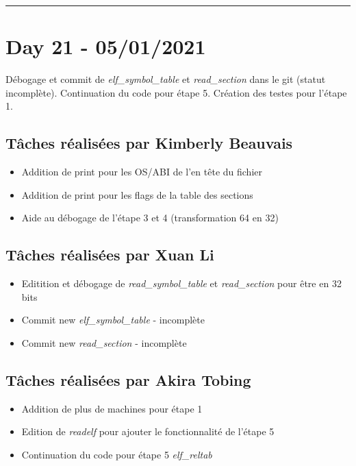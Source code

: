 \documentclass[11pt,letterpaper]{article}
\begin{document}
\noindent\rule{13cm}{0.4pt}

\section*{Day 21 - 05/01/2021}
Débogage et commit de \textit{elf\_symbol\_table} et \textit{read\_section} 
dans le git (statut incomplète). Continuation du code pour étape 5. Création 
des testes pour l'étape 1.

\subsection*{Tâches réalisées par Kimberly Beauvais}
\begin{itemize}
    \item Addition de print pour les OS/ABI de l'en tête du fichier
    \item Addition de print pour les flags de la table des sections
    \item Aide au débogage de l'étape 3 et 4 (transformation 64 en 32)
\end{itemize}

\subsection*{Tâches réalisées par Xuan Li}
\begin{itemize}
    \item Editition et débogage de \textit{read\_symbol\_table} et 
    \textit{read\_section} pour être en 32 bits
    \item Commit new \textit{elf\_symbol\_table} - incomplète
    \item Commit new \textit{read\_section} - incomplète
\end{itemize}

\subsection*{Tâches réalisées par Akira Tobing}
\begin{itemize}
    \item Addition de plus de machines pour étape 1
    \item Edition de \textit{readelf} pour ajouter le fonctionnalité de l'étape 5
    \item Continuation du code pour étape 5 \textit{elf\_reltab}
\end{itemize}
\end{document}

